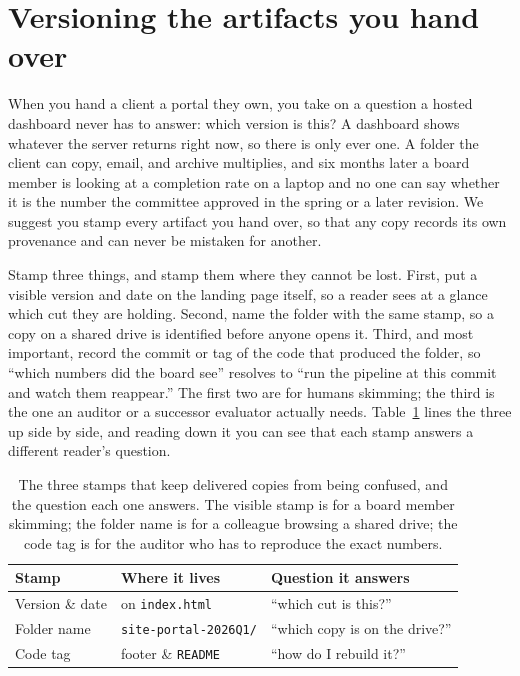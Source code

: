 \documentclass[
    a4paper,
    fontsize=10pt,
    twoside=true,
    numbers=noenddot,
]{kaobook}
\begin{document}
\section{Versioning the artifacts you hand over}\label{sec:versioning}
When you hand a client a portal they own, you take on a question a hosted dashboard never has to answer: which version is this? A dashboard shows whatever the server returns right now, so there is only ever one. A folder the client can copy, email, and archive multiplies, and six months later a board member is looking at a completion rate on a laptop and no one can say whether it is the number the committee approved in the spring or a later revision. We suggest you stamp every artifact you hand over, so that any copy records its own provenance and can never be mistaken for another.

Stamp three things, and stamp them where they cannot be lost. First, put a visible version and date on the landing page itself, so a reader sees at a glance which cut they are holding. Second, name the folder with the same stamp, so a copy on a shared drive is identified before anyone opens it. Third, and most important, record the commit or tag of the code that produced the folder, so \enquote{which numbers did the board see} resolves to \enquote{run the pipeline at this commit and watch them reappear.} The first two are for humans skimming; the third is the one an auditor or a successor evaluator actually needs. Table~\ref{tab:stamps} lines the three up side by side, and reading down it you can see that each stamp answers a different reader's question.

\begin{table}[htbp]
\centering
\footnotesize
\caption[What to stamp on a delivered portal]{The three stamps that keep delivered copies from being confused, and the question each one answers. The visible stamp is for a board member skimming; the folder name is for a colleague browsing a shared drive; the code tag is for the auditor who has to reproduce the exact numbers.}
\label{tab:stamps}
\begin{tabular}{lll}
\hline
Stamp & Where it lives & Question it answers \\
\hline
Version \& date & on \texttt{index.html} & \enquote{which cut is this?} \\
Folder name     & \texttt{site-portal-2026Q1/} & \enquote{which copy is on the drive?} \\
Code tag        & footer \& \texttt{README} & \enquote{how do I rebuild it?} \\
\hline
\end{tabular}
\end{table}
\end{document}
